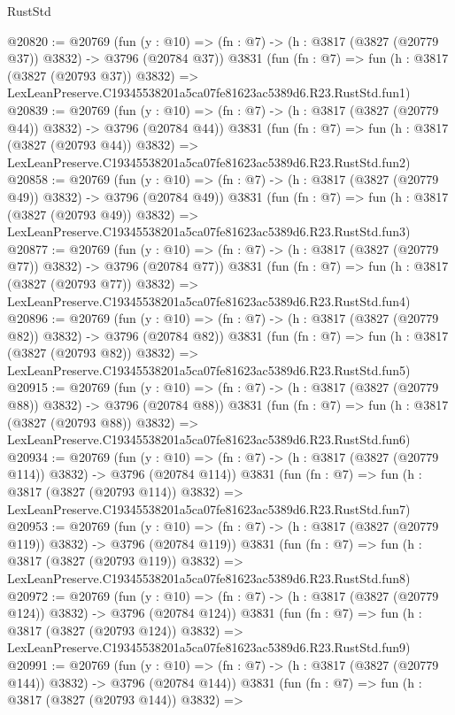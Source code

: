 \begin{lexlean}{RustStd}
\begin{coremodule}
@20820 := @20769
    (fun (y : @10) => (fn : @7) -> (h : @3817 (@3827 (@20779 @37)) @3832) -> @3796 (@20784 @37))
    @3831
    (fun (fn : @7) =>
    fun (h : @3817 (@3827 (@20793 @37)) @3832) =>
    LexLeanPreserve.C19345538201a5ca07fe81623ac5389d6.R23.RustStd.fun1)
@20839 := @20769
    (fun (y : @10) => (fn : @7) -> (h : @3817 (@3827 (@20779 @44)) @3832) -> @3796 (@20784 @44))
    @3831
    (fun (fn : @7) =>
    fun (h : @3817 (@3827 (@20793 @44)) @3832) =>
    LexLeanPreserve.C19345538201a5ca07fe81623ac5389d6.R23.RustStd.fun2)
@20858 := @20769
    (fun (y : @10) => (fn : @7) -> (h : @3817 (@3827 (@20779 @49)) @3832) -> @3796 (@20784 @49))
    @3831
    (fun (fn : @7) =>
    fun (h : @3817 (@3827 (@20793 @49)) @3832) =>
    LexLeanPreserve.C19345538201a5ca07fe81623ac5389d6.R23.RustStd.fun3)
@20877 := @20769
    (fun (y : @10) => (fn : @7) -> (h : @3817 (@3827 (@20779 @77)) @3832) -> @3796 (@20784 @77))
    @3831
    (fun (fn : @7) =>
    fun (h : @3817 (@3827 (@20793 @77)) @3832) =>
    LexLeanPreserve.C19345538201a5ca07fe81623ac5389d6.R23.RustStd.fun4)
@20896 := @20769
    (fun (y : @10) => (fn : @7) -> (h : @3817 (@3827 (@20779 @82)) @3832) -> @3796 (@20784 @82))
    @3831
    (fun (fn : @7) =>
    fun (h : @3817 (@3827 (@20793 @82)) @3832) =>
    LexLeanPreserve.C19345538201a5ca07fe81623ac5389d6.R23.RustStd.fun5)
@20915 := @20769
    (fun (y : @10) => (fn : @7) -> (h : @3817 (@3827 (@20779 @88)) @3832) -> @3796 (@20784 @88))
    @3831
    (fun (fn : @7) =>
    fun (h : @3817 (@3827 (@20793 @88)) @3832) =>
    LexLeanPreserve.C19345538201a5ca07fe81623ac5389d6.R23.RustStd.fun6)
@20934 := @20769
    (fun (y : @10) => (fn : @7) -> (h : @3817 (@3827 (@20779 @114)) @3832) -> @3796 (@20784 @114))
    @3831
    (fun (fn : @7) =>
    fun (h : @3817 (@3827 (@20793 @114)) @3832) =>
    LexLeanPreserve.C19345538201a5ca07fe81623ac5389d6.R23.RustStd.fun7)
@20953 := @20769
    (fun (y : @10) => (fn : @7) -> (h : @3817 (@3827 (@20779 @119)) @3832) -> @3796 (@20784 @119))
    @3831
    (fun (fn : @7) =>
    fun (h : @3817 (@3827 (@20793 @119)) @3832) =>
    LexLeanPreserve.C19345538201a5ca07fe81623ac5389d6.R23.RustStd.fun8)
@20972 := @20769
    (fun (y : @10) => (fn : @7) -> (h : @3817 (@3827 (@20779 @124)) @3832) -> @3796 (@20784 @124))
    @3831
    (fun (fn : @7) =>
    fun (h : @3817 (@3827 (@20793 @124)) @3832) =>
    LexLeanPreserve.C19345538201a5ca07fe81623ac5389d6.R23.RustStd.fun9)
@20991 := @20769
    (fun (y : @10) => (fn : @7) -> (h : @3817 (@3827 (@20779 @144)) @3832) -> @3796 (@20784 @144))
    @3831
    (fun (fn : @7) =>
    fun (h : @3817 (@3827 (@20793 @144)) @3832) =>

\end{coremodule}
\end{lexlean}
